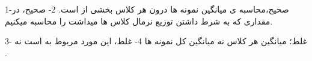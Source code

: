 
1-صحیح،محاسبه ی میانگین نمونه ها درون هر کلاس بخشی از 
است.
2-
صحیح،
در
مقداری که
به شرط داشتن توزیع نرمال کلاس ها میداشت را محاسبه میکنیم.

3- 
غلط؛ میانگین هر کلاس نه میانگین کل نمونه ها
4-
غلط، این مورد مربوط به
است نه
.